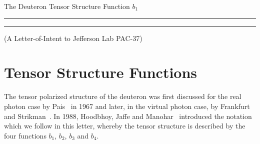 \documentclass[11pt]{article}
\def\ks{\vspace{0.4cm}\\}
\begin{document}
\pagestyle{empty}
 
\begin{center}
 \LARGE{
  The Deuteron Tensor Structure Function $b_1$
 }
\end{center}
%
\hrule \vspace{.05cm}\hrule
%
\begin{center}
(A Letter-of-Intent to Jefferson Lab PAC-37)

\vspace{1.5cm}

\end{center}


{}
\newpage
\begin{abstract}
  
\end{abstract}



\newpage
%

\newpage
  \scriptsize
  \tableofcontents
  \normalsize
\newpage


\pagestyle{plain}


\normalsize

%  

\clearpage
\section{Tensor Structure Functions}
The tensor polarized structure of the deuteron was first discussed for the real photon case
by Pais~\cite{Pais:1967zz} in 1967 and later, in the virtual photon case, by Frankfurt and
Strikman~\cite{Frankfurt:1983qs}. In 1988, Hoodbhoy, Jaffe and Manohar~\cite{Hoodbhoy:1988am}
introduced the notation which we follow in this letter, whereby the tensor structure is described
by the four functions $b_1$, $b_2$, $b_3$ and $b_4$.  

  
\end{document}
